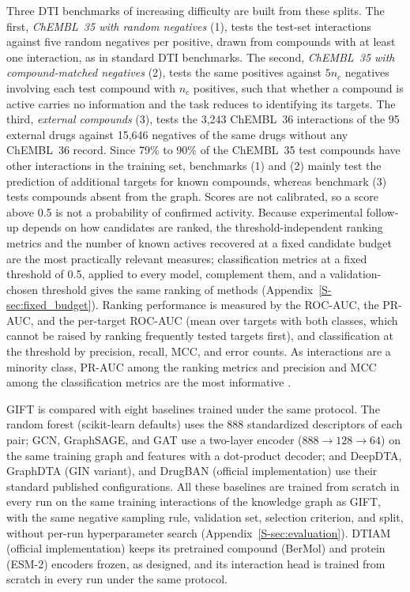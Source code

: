 \documentclass[10pt,letterpaper]{article}
\begin{document}
Three DTI benchmarks of increasing difficulty are built from these splits. The first, \emph{ChEMBL~35 with random negatives} (1), tests the test-set interactions against five random negatives per positive, drawn from compounds with at least one interaction, as in standard DTI benchmarks. The second, \emph{ChEMBL~35 with compound-matched negatives} (2), tests the same positives against $5n_c$ negatives involving each test compound with $n_c$ positives, such that whether a compound is active carries no information and the task reduces to identifying its targets. The third, \emph{external compounds} (3), tests the 3,243 ChEMBL~36 interactions of the 95 external drugs against 15,646 negatives of the same drugs without any ChEMBL~36 record. Since 79\% to 90\% of the ChEMBL~35 test compounds have other interactions in the training set, benchmarks (1) and (2) mainly test the prediction of additional targets for known compounds, whereas benchmark (3) tests compounds absent from the graph. Scores are not calibrated, so a score above 0.5 is not a probability of confirmed activity. Because experimental follow-up depends on how candidates are ranked, the threshold-independent ranking metrics and the number of known actives recovered at a fixed candidate budget are the most practically relevant measures; classification metrics at a fixed threshold of 0.5, applied to every model, complement them, and a validation-chosen threshold gives the same ranking of methods (Appendix~\ref{S-sec:fixed_budget}). Ranking performance is measured by the ROC-AUC, the PR-AUC, and the per-target ROC-AUC (mean over targets with both classes, which cannot be raised by ranking frequently tested targets first), and classification at the threshold by precision, recall, MCC, and error counts. As interactions are a minority class, PR-AUC among the ranking metrics and precision and MCC among the classification metrics are the most informative \cite{saito2015precision, chicco2020advantages}.

GIFT is compared with eight baselines trained under the same protocol. The random forest (scikit-learn defaults) uses the 888 standardized descriptors of each pair; GCN, GraphSAGE, and GAT use a two-layer encoder ($888\to128\to64$) on the same training graph and features with a dot-product decoder; and DeepDTA, GraphDTA (GIN variant), and DrugBAN (official implementation) use their standard published configurations. All these baselines are trained from scratch in every run on the same training interactions of the knowledge graph as GIFT, with the same negative sampling rule, validation set, selection criterion, and split, without per-run hyperparameter search (Appendix~\ref{S-sec:evaluation}). DTIAM (official implementation) keeps its pretrained compound (BerMol) and protein (ESM-2) encoders frozen, as designed, and its interaction head is trained from scratch in every run under the same protocol.
\end{document}
